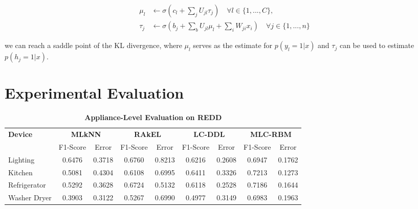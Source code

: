 \documentclass{article}
\begin{document}
\begin{align}
    \mu_l & \leftarrow \sigma(c_l + \sum_jU_{jl}\tau_j) \quad \forall l \in \{1,...,C\}, \\
    \tau_j & \leftarrow \sigma(b_j + \sum_bU_{jl}\mu_l+\sum_iW_{ji}x_i) \quad \forall j \in \{1,...,n\}
\end{align}

we can reach a saddle point of the KL divergence, where $\mu_l$ serves as the estimate for $p(y_l=1|x)$ and $\tau_j$ can be used to estimate $p(h_j=1|x)$.

\section{Experimental Evaluation}

\begin{table}[!ht]
\centering
\caption{\textbf{Appliance-Level Evaluation on REDD } }
\label{tab1}
\begin{tabular}{l cc cc cc cc}
\toprule[0.2mm]
\multirow{2}{0.5cm}{\textbf{Device}}&\multicolumn{2}{c}{\textbf{MLkNN}}&\multicolumn{2}{c}{\textbf{RAkEL}}&\multicolumn{2}{c}{\textbf{LC-DDL}}&\multicolumn{2}{c}{\textbf{MLC-RBM}} \\
 &F1-Score &Error&F1-Score&Error &F1-Score&Error&F1-Score&Error\\
\midrule
Lighting       &0.6476 &0.3718     &0.6760 &0.8213      &0.6216 &0.2608      & 0.6947& 0.1762             \\

Kitchen        &0.5081 &0.4304     &0.6108 &0.6995               &0.6411 &0.3326      &0.7213 & 0.1273 \\

Refrigerator   &0.5292 &0.3628     &0.6724 &0.5132               &0.6118 &0.2528      &0.7186 & 0.1644\\

Washer Dryer   &0.3903 &0.3122     &0.5267 &0.6990               &0.4977 &0.3149      &0.6983 & 0.1963\\
\bottomrule[0.2mm]
\end{tabular}
\end{table}
\end{document}
